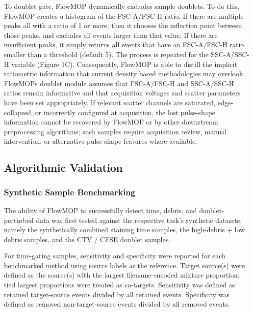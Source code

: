 \documentclass[ASNA]{latex/wiley/USG}
\begin{document}
To doublet gate, FlowMOP dynamically excludes sample doublets. To do
this, FlowMOP creates a histogram of the FSC-A/FSC-H ratio. If there are
multiple peaks all with a ratio of 1 or more, then it chooses the
inflection point between those peaks, and excludes all events larger
than that value. If there are insufficient peaks, it simply returns all
events that have an FSC-A/FSC-H ratio smaller than a threshold (default
5). The process is repeated for the SSC-A/SSC-H variable (Figure 1C).
Consequently, FlowMOP is able to distill the implicit ratiometric
information that current density based methodologies may overlook.
FlowMOP\textquotesingle s doublet module assumes that FSC-A/FSC-H and
SSC-A/SSC-H ratios remain informative and that acquisition voltages and
scatter parameters have been set appropriately. If relevant scatter
channels are saturated, edge-collapsed, or incorrectly configured at
acquisition, the lost pulse-shape information cannot be recovered by
FlowMOP or by other downstream preprocessing algorithms; such samples
require acquisition review, manual intervention, or alternative
pulse-shape features where available.

\subsection{Algorithmic Validation}\label{algorithmic-validation}

\subsubsection{Synthetic Sample
Benchmarking}\label{synthetic-sample-benchmarking}

The ability of FlowMOP to successfully detect time, debris, and
doublet-perturbed data was first tested against the respective task's
synthetic datasets, namely the synthetically combined staining time
samples, the high-debris + low debris samples, and the CTV / CFSE
doublet samples.

For time-gating samples, sensitivity and specificity were reported for
each benchmarked method using source labels as the reference. Target
source(s) were defined as the source(s) with the largest
filename-encoded mixture proportion; tied largest proportions were
treated as co-targets. Sensitivity was defined as retained target-source
events divided by all retained events. Specificity was defined as
removed non-target-source events divided by all removed events.
\end{document}
